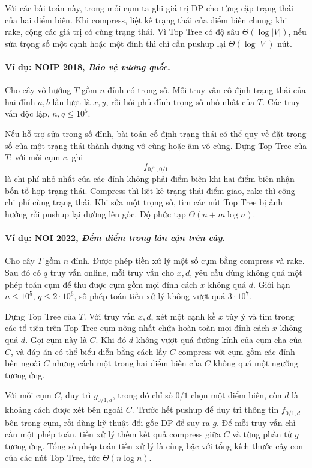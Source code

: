 \documentclass[11pt]{article}
\begin{document}
Với các bài toán này, trong mỗi cụm ta ghi giá trị DP cho từng cặp trạng thái
của hai điểm biên. Khi compress, liệt kê trạng thái của điểm biên chung; khi
rake, cộng các giá trị có cùng trạng thái. Vì Top Tree có độ sâu
\(\Theta(\log |V|)\), nếu sửa trọng số một cạnh hoặc một đỉnh thì chỉ cần
pushup lại \(\Theta(\log |V|)\) nút.

\paragraph{Ví dụ: NOIP 2018, \emph{Bảo vệ vương quốc}.}
Cho cây vô hướng \(T\) gồm \(n\) đỉnh có trọng số. Mỗi truy vấn cố định trạng
thái của hai đỉnh \(a,b\) lần lượt là \(x,y\), rồi hỏi phủ đỉnh trọng số nhỏ
nhất của \(T\). Các truy vấn độc lập, \(n,q\le 10^5\).

Nếu hỗ trợ sửa trọng số đỉnh, bài toán cố định trạng thái có thể quy về đặt
trọng số của một trạng thái thành dương vô cùng hoặc âm vô cùng. Dựng Top Tree
của \(T\); với mỗi cụm \(c\), ghi
\[
  f_{0/1,0/1}
\]
là chi phí nhỏ nhất của các đỉnh không phải điểm biên khi hai điểm biên nhận
bốn tổ hợp trạng thái. Compress thì liệt kê trạng thái điểm giao, rake thì
cộng chi phí cùng trạng thái. Khi sửa một trọng số, tìm các nút Top Tree bị
ảnh hưởng rồi pushup lại đường lên gốc. Độ phức tạp
\(\Theta(n+m\log n)\).

\paragraph{Ví dụ: NOI 2022, \emph{Đếm điểm trong lân cận trên cây}.}
Cho cây \(T\) gồm \(n\) đỉnh. Được phép tiền xử lý một số cụm bằng compress và
rake. Sau đó có \(q\) truy vấn online, mỗi truy vấn cho \(x,d\), yêu cầu dùng
không quá một phép toán cụm để thu được cụm gồm mọi đỉnh cách \(x\) không quá
\(d\). Giới hạn \(n\le 10^5\), \(q\le 2\cdot 10^6\), số phép toán tiền xử lý
không vượt quá \(3\cdot 10^7\).

Dựng Top Tree của \(T\). Với truy vấn \(x,d\), xét một cạnh kề \(x\) tùy ý và
tìm trong các tổ tiên trên Top Tree cụm nông nhất chứa hoàn toàn mọi đỉnh cách
\(x\) không quá \(d\). Gọi cụm này là \(C\). Khi đó \(d\) không vượt quá đường
kính của cụm cha của \(C\), và đáp án có thể biểu diễn bằng cách lấy \(C\)
compress với cụm gồm các đỉnh bên ngoài \(C\) nhưng cách một trong hai điểm
biên của \(C\) không quá một ngưỡng tương ứng.

Với mỗi cụm \(C\), duy trì \(g_{0/1,d}\), trong đó chỉ số \(0/1\) chọn một
điểm biên, còn \(d\) là khoảng cách được xét bên ngoài \(C\). Trước hết pushup
để duy trì thông tin \(f_{0/1,d}\) bên trong cụm, rồi dùng kỹ thuật đổi gốc DP
để suy ra \(g\). Để mỗi truy vấn chỉ cần một phép toán, tiền xử lý thêm kết
quả compress giữa \(C\) và từng phần tử \(g\) tương ứng. Tổng số phép toán
tiền xử lý là cùng bậc với tổng kích thước cây con của các nút Top Tree, tức
\(\Theta(n\log n)\).
\end{document}

